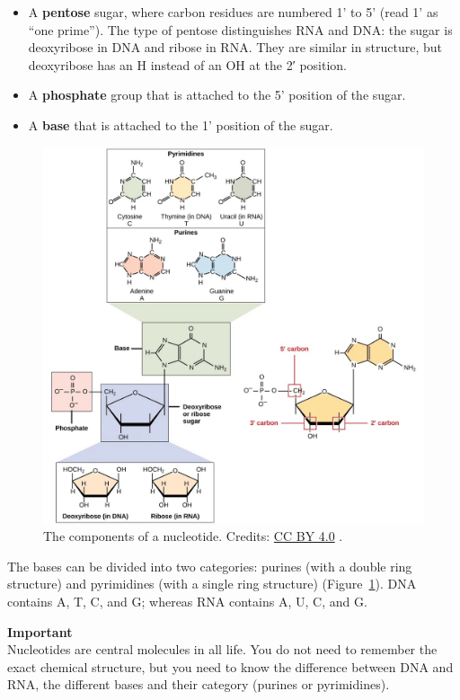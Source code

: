\begin{itemize}
\item A \textbf{pentose} sugar, where carbon residues are numbered 1' to 5' (read 1' as ``one prime'').
The type of pentose distinguishes RNA and DNA: the sugar is deoxyribose in DNA and ribose in RNA.
They are similar in structure, but deoxyribose has an H instead of an OH at the 2′ position.
\item A \textbf{phosphate} group that is attached to the 5' position of the sugar.
\item A \textbf{base} that is attached to the 1' position of the sugar.
\end{itemize}

\begin{figure}[!htbp]
\centering
\includegraphics[width=0.9\linewidth]{files/nucleotide-1c35cedc9ecc9b60b760ac4c6644688f.jpg}
\caption[]{The components of a nucleotide.
Credits: \href{https://creativecommons.org/licenses/by/4.0}{CC BY 4.0} \cite{nucleotide_2018}.}
\label{nucleotide}
\end{figure}

The bases can be divided into two categories: purines (with a double ring structure) and pyrimidines (with a single ring structure) (Figure~\ref{nucleotide}).
DNA contains A, T, C, and G; whereas RNA contains A, U, C, and G.

\begin{framed}
\textbf{Important}\\
Nucleotides are central molecules in all life.
You do not need to remember the exact chemical structure, but you need to know the difference between DNA and RNA, the different bases and their category (purines or pyrimidines).
\end{framed}


